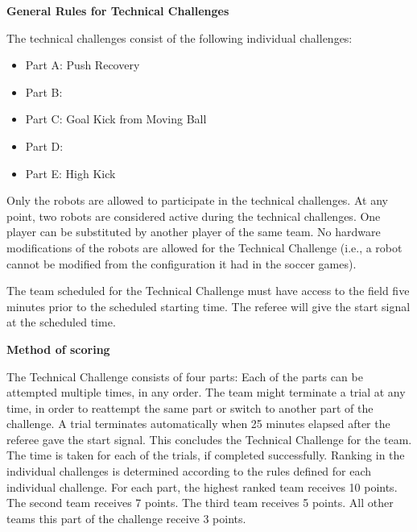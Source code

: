 \clearpage
\sffamily
{\bfseries\color[rgb]{0.4,0.4,0.4}
General Rules for Technical Challenges}
{}

\bigskip

The technical challenges consist of the following individual challenges:

\begin{itemize}
\item Part A: Push Recovery 
\item Part B: 
\item Part C: Goal Kick from Moving Ball
\item Part D:  
\item Part E: High Kick
\end{itemize}

\bigskip

Only the robots   are allowed to participate in the technical challenges.
At any point, two robots are considered active during the technical challenges.
One player can be substituted by another player of the same team.
No hardware modifications of the robots are allowed for the Technical Challenge
(i.e., a robot cannot be modified from the configuration it had in the soccer games). 

\bigskip

The team scheduled for the Technical Challenge must have access to the field five minutes prior to the scheduled starting time. The referee will give the start signal at the scheduled time.

\bigskip

{\bfseries Method of scoring}

\headlinebox
 
The Technical Challenge consists of four parts:
Each of the parts can be attempted multiple times, in any order.
The team might terminate a trial at any time,
in order to reattempt the same part or switch to another part of the challenge.
A trial terminates automatically when 25 minutes elapsed after the referee gave
the start signal.
This concludes the Technical Challenge for the team.
The time is taken for each of the trials, if completed successfully.
Ranking in the individual challenges is determined according to the rules
defined for each individual challenge.
For each part, the highest ranked  team receives 10 points.
The second  team receives 7 points.
The third  team receives 5 points.
All other teams   this part of the challenge receive 3 points.

